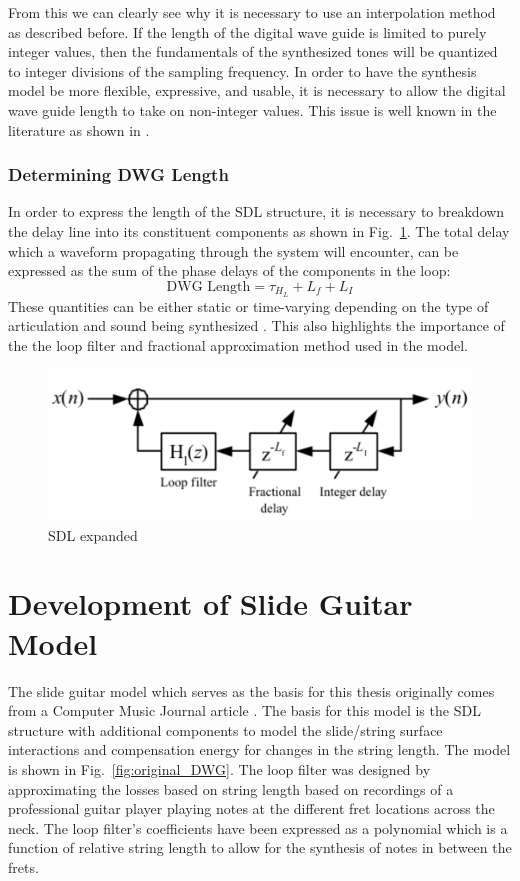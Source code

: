 \documentclass[main.tex]{subfiles}
\begin{document}
From this we can clearly see why it is necessary to use an interpolation method as described before. If the length of the digital wave guide is limited to purely integer values, then the fundamentals of the synthesized tones will be quantized to integer divisions of the sampling frequency. In order to have the synthesis model be more flexible, expressive, and usable, it is necessary to allow the digital wave guide length to take on non-integer values. This issue is well known in the literature as shown in .

\subsubsection{Determining DWG Length}
In order to express the length of the SDL structure, it is necessary to breakdown the delay line into its constituent components as shown in Fig.~\ref{fig:SDLBreakdown}. The total delay which a waveform propagating through the system will encounter, can be expressed as the sum of the phase delays of the components in the loop: 
\begin{equation}
    \text{DWG Length} = \tau_{H_L} + L_f + L_I
\end{equation}
These quantities can be either static or time-varying depending on the type of articulation and sound being synthesized . This also highlights the importance of the the loop filter and fractional approximation method used in the model.

\begin{figure}[h]
    \centering
    \includegraphics[scale=1]{./images/diagrams/SDLModelExpanded.png}
    \caption{SDL expanded }
    \label{fig:SDLBreakdown}
\end{figure}

\section{Development of Slide Guitar Model}
The slide guitar model which serves as the basis for this thesis originally comes from a Computer Music Journal article . The basis for this model is the SDL structure with additional components to model the slide/string surface interactions and compensation energy for changes in the string length. The model is shown in Fig.~\ref{fig:original_DWG}. The loop filter was designed by approximating the losses based on string length based on recordings of a professional guitar player playing notes at the different fret locations across the neck. The loop filter's coefficients have been expressed as a polynomial which is a function of relative string length to allow for the synthesis of notes in between the frets.
\end{document}
